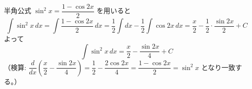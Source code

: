 
半角公式 $\sin^{2} x = \dfrac{1-\cos 2x}{2}$ を用いると
\[
\int \sin^{2} x \, dx = \int \frac{1-\cos 2x}{2}\, dx = \frac{1}{2}\int dx - \frac{1}{2}\int \cos 2x \, dx = \frac{x}{2} - \frac{1}{2}\cdot\frac{\sin 2x}{2} + C
\]
よって
\[
\boxed{\; \int \sin^{2} x \, dx = \frac{x}{2} - \frac{\sin 2x}{4} + C \;}
\]
（検算: $\dfrac{d}{dx}\left(\dfrac{x}{2} - \dfrac{\sin 2x}{4}\right) = \dfrac{1}{2} - \dfrac{2\cos 2x}{4} = \dfrac{1-\cos 2x}{2} = \sin^{2}x$ となり一致する。）
